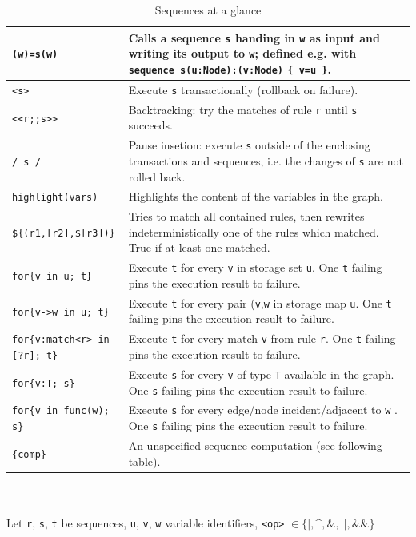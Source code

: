 \begin{table}[htbp]
\begin{minipage}{\linewidth} \renewcommand{\footnoterule}{} 
\begin{tabularx}{\linewidth}{|lX|}
\hline
\texttt{(w)=s(w)} & Calls a sequence \texttt{s} handing in \texttt{w} as input and writing its output to \texttt{w}; defined e.g. with \texttt{sequence s(u:Node):(v:Node)} \texttt{\{ v=u \}}.\\
\hline
\texttt{<s>}	& Execute \texttt{s} transactionally (rollback on failure).\\
\texttt{<<r;;s>>}	& Backtracking: try the matches of rule \texttt{r} until \texttt{s} succeeds.\\
\texttt{/ s /}	& Pause insetion: execute \texttt{s} outside of the enclosing transactions and sequences, i.e. the changes of \texttt{s} are not rolled back.\\
\hline
\texttt{highlight(vars)} & Highlights the content of the variables in the graph. \\
\hline
\texttt{\$\{(r1,[r2],\$[r3])\}}	& Tries to match all contained rules, then rewrites indeterministically one of the rules which matched. True if at least one matched.\\
\hline
\texttt{for\{v in u; t\}}	& Execute \texttt{t} for every \texttt{v} in storage set \texttt{u}. One \texttt{t} failing pins the execution result to failure.\\
\texttt{for\{v->w in u; t\}}	& Execute \texttt{t} for every pair (\texttt{v},\texttt{w} in storage map \texttt{u}. One \texttt{t} failing pins the execution result to failure.\\
\texttt{for\{v:match<r> in [?r]; t\}}	& Execute \texttt{t} for every match \texttt{v} from rule \texttt{r}. One \texttt{t} failing pins the execution result to failure.\\
\texttt{for\{v:T; s\}}	& Execute \texttt{s} for every \texttt{v} of type \texttt{T} available in the graph. One \texttt{s} failing pins the execution result to failure.\\
\texttt{for\{v in func(w); s\}}	& Execute \texttt{s} for every edge/node incident/adjacent to \texttt{w} . One \texttt{s} failing pins the execution result to failure.\\
\hline
\texttt{\{comp\}}	& An unspecified sequence computation (see following table).\\
\hline
\end{tabularx}\indexmain{\texttt{<>}}\indexmain{\texttt{<<;>>}}
\end{minipage}\\
\\ 
{\small Let \texttt{r}, \texttt{s}, \texttt{t} be sequences, \texttt{u}, \texttt{v}, \texttt{w} variable identifiers, \texttt{<op>} $\in \{\texttt{|}, \texttt{\textasciicircum}, \texttt{\&}, \texttt{||}, \texttt{\&\&}\}$ }%
\caption{Sequences at a glance}
\label{seqtab}
\end{table}
 

